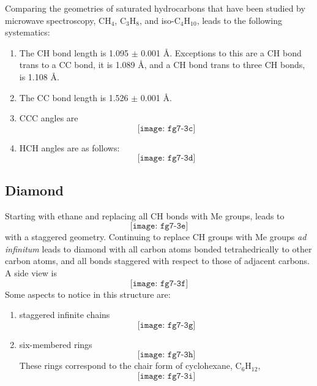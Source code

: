 Comparing the geometries of saturated hydrocarbons that have 
been studied by microwave spectroscopy, CH$_4$, C$_3$H$_8$, and 
iso-C$_4$H$_{10}$, leads to the following systematics:
\begin{enumerate}
\item The CH bond length is 1.095 $\pm$ 0.001 \AA.  Exceptions to 
this are a CH bond trans to a CC bond, it is 1.089 \AA, and 
a CH bond trans to three CH bonds, is 1.108 \AA.

\item The CC bond length is 1.526 $\pm$ 0.001 \AA.

\item CCC angles are 
\begin{equation}
\texttt{[image: fg7-3c]}
\label{chap7-eqno7}
\end{equation}

\item HCH angles are as follows:
\begin{equation}
\texttt{[image: fg7-3d]}
\label{chap7-eqno8}
\end{equation}
\end{enumerate}

\subsection{Diamond}

Starting with ethane and replacing all CH bonds with Me groups, leads
to
\begin{equation}
\texttt{[image: fg7-3e]}
\label{chap7-eqno9}
\end{equation}
with a staggered geometry.  Continuing to replace CH groups with Me 
groups \emph{ad infinitum} leads to diamond with all carbon atoms bonded 
tetrahedrically to other carbon atoms, and all bonds staggered with 
respect to those of adjacent carbons.  A side view is
\begin{equation}
\texttt{[image: fg7-3f]}
\label{chap7-eqno10}
\end{equation}
Some aspects to notice in this structure are: 
\begin{enumerate}
\item staggered infinite chains
\begin{equation}
\texttt{[image: fg7-3g]}
\label{chap7-eqno11}
\end{equation}

\item six-membered rings
\begin{equation}
\texttt{[image: fg7-3h]}
\label{chap7-eqno12}
\end{equation}
These rings correspond to the chair form of cyclohexane, 
C$_6$H$_{12}$,
\begin{equation}
\texttt{[image: fg7-3i]}
\label{chap7-eqno13}
\end{equation}
\end{enumerate}


